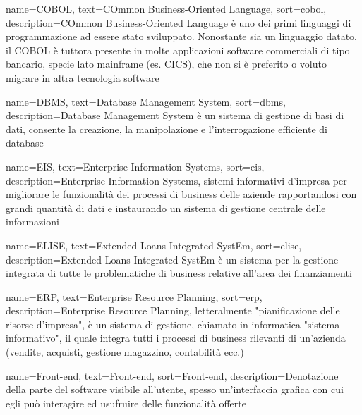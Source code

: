 {
    name=COBOL,
    text=COmmon Business-Oriented Language,
    sort=cobol,
    description={COmmon Business-Oriented Language è uno dei primi linguaggi di programmazione ad essere stato sviluppato. Nonostante sia un linguaggio datato, il COBOL è tuttora presente in molte applicazioni software commerciali di tipo bancario, specie lato mainframe (es. CICS), che non si è preferito o voluto migrare in altra tecnologia software}
}


 
{
    name=DBMS,
    text=Database Management System,
    sort=dbms,
    description={Database Management System è un sistema di gestione di basi di dati, consente la creazione, la manipolazione e l'interrogazione efficiente di database}
}

{
    name=EIS,
    text=Enterprise Information Systems,
    sort=eis,
    description={Enterprise Information Systems, sistemi informativi d'impresa per migliorare le funzionalità dei processi di business delle aziende rapportandosi con grandi quantità di dati e instaurando un sistema di gestione centrale delle informazioni}
}

{
    name=ELISE,
    text=Extended Loans Integrated SystEm,
    sort=elise,
    description={Extended Loans Integrated SystEm è un sistema per la gestione integrata di tutte le problematiche di business relative all'area dei finanziamenti}
}

{
    name=ERP,
    text=Enterprise Resource Planning,
    sort=erp,
    description={Enterprise Resource Planning, letteralmente "pianificazione delle risorse d'impresa", è un sistema di gestione, chiamato in informatica "sistema informativo", il quale integra tutti i processi di business rilevanti di un'azienda (vendite, acquisti, gestione magazzino, contabilità ecc.)}
}


{
    name=Front-end,
    text=Front-end,
    sort=Front-end,
    description={Denotazione della parte del software visibile all'utente, spesso un'interfaccia grafica con cui egli può interagire ed usufruire delle funzionalità offerte}
}


